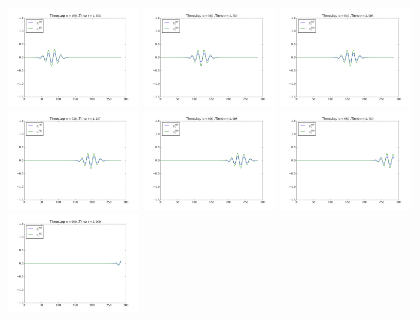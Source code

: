 \documentclass{article} %
\theoremstyle{plain}
\numberwithin{equation}{section} %
\numberwithin{figure}{section} %
\numberwithin{table}{section} %
\begin{document}
\begin{enumerate}[\ \ (a)]
\begin{figure}[ht!]
            \includegraphics[width=0.31\textwidth]{figures/problem_1_a_048.png}
            \includegraphics[width=0.31\textwidth]{figures/problem_1_a_056.png}
            \includegraphics[width=0.31\textwidth]{figures/problem_1_a_064.png}
            \includegraphics[width=0.31\textwidth]{figures/problem_1_a_072.png}
            \includegraphics[width=0.31\textwidth]{figures/problem_1_a_080.png}
            \includegraphics[width=0.31\textwidth]{figures/problem_1_a_088.png}
            \includegraphics[width=0.31\textwidth]{figures/problem_1_a_096.png}

\end{figure}
\end{enumerate}
\end{document}
